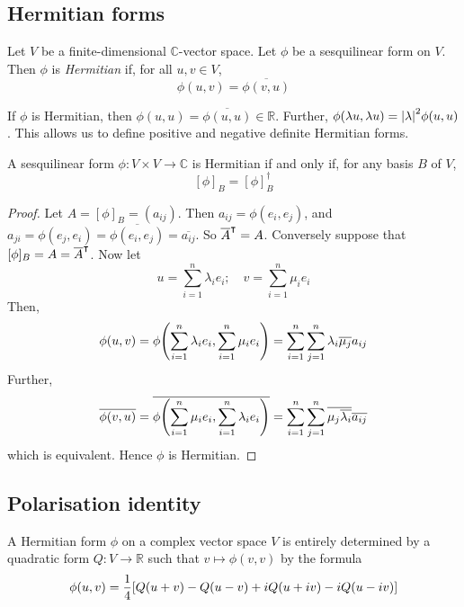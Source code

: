 \subsection{Hermitian forms}
\begin{definition}
	Let \( V \) be a finite-dimensional \( \mathbb C \)-vector space.
	Let \( \phi \) be a sesquilinear form on \( V \).
	Then \( \phi \) is \textit{Hermitian} if, for all \( u, v \in V \),
	\[
		\phi(u, v) = \overline{\phi(v,u)}
	\]
\end{definition}
\begin{remark}
	If \( \phi \) is Hermitian, then \( \phi(u,u) = \overline{\phi(u,u)} \in \mathbb R \).
	Further, \( \phi(\lambda u, \lambda u) = \abs{\lambda}^2 \phi(u,u) \).
	This allows us to define positive and negative definite Hermitian forms.
\end{remark}
\begin{lemma}
	A sesquilinear form \( \phi \colon V \times V \to \mathbb C \) is Hermitian if and only if, for any basis \( B \) of \( V \),
	\[
		[\phi]_B = [\phi]_B^\dagger
	\]
\end{lemma}
\begin{proof}
	Let \( A = [\phi]_B = (a_{ij}) \).
	Then \( a_{ij} = \phi(e_i, e_j) \), and \( a_{ji} = \phi(e_j, e_i) = \overline{\phi(e_i, e_j)} = \overline{a_{ij}} \).
	So \( \overline A^\intercal = A \).
	Conversely suppose that \( [\phi]_B = A = \overline A^\intercal \).
	Now let
	\[
		u = \sum_{i=1}^n \lambda_i e_i;\quad v = \sum_{i=1}^n \mu_i e_i
	\]
	Then,
	\[
		\phi(u,v) = \phi\qty(\sum_{i=1}^n \lambda_i e_i, \sum_{i=1}^n \mu_i e_i) = \sum_{i=1}^n \sum_{j=1}^n \lambda_i \overline{\mu_j} a_{ij}
	\]
	Further,
	\[
		\overline{\phi(v,u)} = \overline{\phi\qty(\sum_{i=1}^n \mu_i e_i, \sum_{i=1}^n \lambda_i e_i)} = \sum_{i=1}^n \sum_{j=1}^n \overline{\mu_j \overline{\lambda_i}} \overline{a_{ij}}
	\]
	which is equivalent.
	Hence \( \phi \) is Hermitian.
\end{proof}

\subsection{Polarisation identity}
A Hermitian form \( \phi \) on a complex vector space \( V \) is entirely determined by a quadratic form \( Q \colon V \to \mathbb R \) such that \( v \mapsto \phi(v,v) \) by the formula
\[
	\phi(u,v) = \frac{1}{4} \qty[ Q(u+v) - Q(u-v) + iQ(u+iv) - iQ(u-iv) ]
\]

